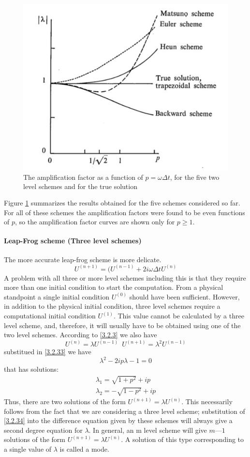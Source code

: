 \begin{figure}[h]
    \centering
    \includegraphics[width=0.50\linewidth]{uploads/Screenshot 2024-11-12 101958.png}
    \caption{The amplification factor as a function of $p=\omega\Delta t$, for the five two level schemes and for the true solution}
    \label{fig:3.2.1}
\end{figure}
Figure \ref{fig:3.2.1} summarizes the results obtained for the five schemes considered so far. For all of these schemes the amplification factors were found to be even functions of $p$, so the amplification factor curves are shown only for $p\geq 1$.
\paragraph{Leap-Frog scheme (Three level schemes)}
The more accurate leap-frog scheme is more delicate. 
\begin{equation}\label{3.2.33}
    U^{(n+1)}=(U^{(n-1)}+2i\omega\Delta tU^{(n)}
\end{equation}
A problem with all three or more level schemes including this is that they require more than one initial condition to start the computation. From a physical standpoint a single initial condition $U^{(0)}$ should have been sufficient. However, in addition to the physical initial condition, three level schemes require a computational initial condition $U^{(1)}$. This value cannot be calculated by a three level scheme, and, therefore, it will usually have to be obtained using one of the two level schemes. According to \ref{3.2.3} we also have
\begin{equation}\label{3.2.34}
    U^{(n)}=\lambda U^{(n-1)}\,\,\, U^{(n+1)}=\lambda^2U^{(n-1)}
\end{equation}
substitued in \ref{3.2.33} we have
$$\lambda^2-2ip\lambda-1=0$$ that has solutions:
\begin{align*}
    \lambda_1=\sqrt{1+p^2}+ip \\
    \lambda_2=-\sqrt{1-p^2}+ip
\end{align*}
Thus, there are two solutions of the form $U^{(n+1)}=\lambda U^{(n)}$. This necessarily follows from the fact that we are considering a three level scheme; substitution of \ref{3.2.34} into the difference equation given by these schemes will always give a second degree equation for $\lambda$. In general, an m level scheme will give $m — 1$ solutions of the form $U^{(n+1)}=\lambda U^{(n)}$. A solution of this type corresponding to a single value of $\lambda$ is called a mode.

